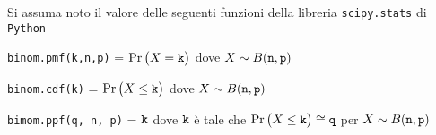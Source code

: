 \documentclass[11pt,twoside,a4paper]{article}
\begin{document}
\vfill
\hrulefill

Si assuma noto il valore delle seguenti funzioni della libreria {\tt scipy.stats\/} di  {\tt Python\/}

{\tt binom.pmf(k,n,p)} = $\Pr\big(X={\tt k}\big)$ dove $X\sim B({\tt n},{\tt p})$ 

{\tt binom.cdf(k)} = $\Pr\big(X\le{\tt k}\big)$ dove  $X\sim B({\tt n},{\tt p})$ 

{\tt bimom.ppf(q, n, p)} = ${\tt k}$ dove ${\tt k}$ è tale che $\Pr\big(X\le{\tt k}\big)\cong{\tt q}$ per $X\sim B({\tt n},{\tt p})$ 
\end{document}
